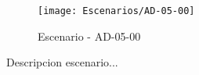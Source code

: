 \begin{figure}[H]
\centering
\texttt{[image: Escenarios/AD-05-00]}
\caption{Escenario - AD-05-00}
\label{fig:AD-05-00}
\end{figure}

Descripcion escenario...
\clearpage
